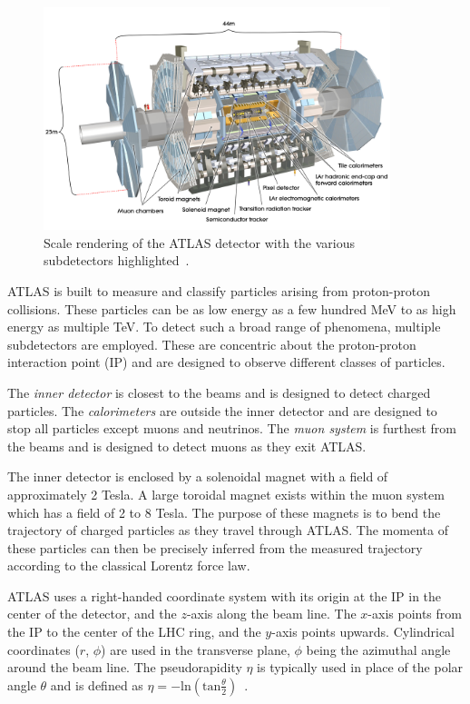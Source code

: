 \begin{figure}[tp]
  \centering
  \includegraphics[width=0.90\textwidth]{figures/lhc-atlas/atlas-0803012_01.jpg}
  \caption{Scale rendering of the ATLAS detector with the various subdetectors highlighted~\cite{atlas-cgi-detector}.}
  \label{fig:atlas-cartoon}
\end{figure}

ATLAS is built to measure and classify particles arising from proton-proton collisions. These particles can be as low energy as a few hundred MeV to as high energy as multiple TeV. To detect such a broad range of phenomena, multiple subdetectors are employed. These are concentric about the proton-proton interaction point (IP) and are designed to observe different classes of particles. 

The \textit{inner detector} is closest to the beams and is designed to detect charged particles. The \textit{calorimeters} are outside the inner detector and are designed to stop all particles except muons and neutrinos. The \textit{muon system} is furthest from the beams and is designed to detect muons as they exit ATLAS. 

The inner detector is enclosed by a solenoidal magnet with a field of approximately 2 Tesla. A large toroidal magnet exists within the muon system which has a field of 2 to 8 Tesla. The purpose of these magnets is to bend the trajectory of charged particles as they travel through ATLAS. The momenta of these particles can then be precisely inferred from the measured trajectory according to the classical Lorentz force law.

ATLAS uses a right-handed coordinate system with its origin at the IP in the center of the detector, and the $z$-axis along the beam line. The $x$-axis points from the IP to the center of the LHC ring, and the $y$-axis points upwards. Cylindrical coordinates ($r$, $\phi$) are used in the transverse plane, $\phi$ being the azimuthal angle around the beam line. The pseudorapidity $\eta$ is typically used in place of the polar angle $\theta$ and is defined as $\eta = -\text{ln}(\text{tan}\frac{\theta}{2})$~\cite{HIGG-2012-27}.

